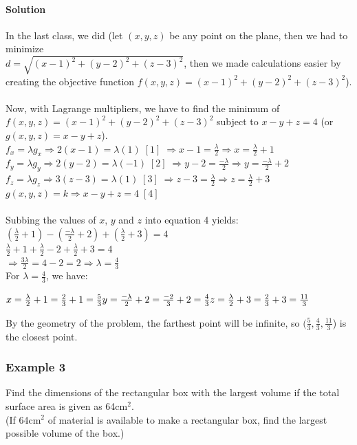 \documentclass{article}
\newenvironment{ind}[1]
 {\begin{list}{}
         {\setlength{\leftmargin}{#1}}
         \item[]
 }
 {\end{list}}
\begin{document}
\paragraph{Solution} In the last class, we did (let $(x,y,z)$ be any point on the plane, then we had to minimize \\$d=\sqrt{(x-1)^2+(y-2)^2+(z-3)^2}$,
then we made calculations easier by creating the objective function $f(x,y,z)=(x-1)^2+(y-2)^2+(z-3)^2$).
\\\\Now, with Lagrange multipliers, we have to find the minimum of $f(x,y,z)=(x-1)^2+(y-2)^2+(z-3)^2$ subject to $x-y+z=4$ (or $g(x,y,z)=x-y+z$).
\\$f_x=\lambda g_x\Rightarrow2(x-1)=\lambda(1)\;[1]\;\Rightarrow x-1=\frac{\lambda}{2}\Rightarrow x=\frac{\lambda}{2}+1$
\\$f_y=\lambda g_y\Rightarrow2(y-2)=\lambda(-1)\;[2]\;\Rightarrow y-2=\frac{-\lambda}{2}\Rightarrow y=\frac{-\lambda}{2}+2$
\\$f_z=\lambda g_z\Rightarrow3(z-3)=\lambda(1)\;[3]\;\Rightarrow z-3=\frac{\lambda}{2}\Rightarrow z=\frac{\lambda}{2}+3$
\\$g(x,y,z)=k\Rightarrow x-y+z=4\;[4]$
\\\\Subbing the values of $x$, $y$ and $z$ into equation 4 yields: $(\frac{\lambda}{2}+1)-(\frac{-\lambda}{2}+2)+(\frac{\lambda}{2}+3)=4$
\\$\frac{\lambda}{2}+1+\frac{\lambda}{2}-2+\frac{\lambda}{2}+3=4$
\\$\Rightarrow \frac{3\lambda}{2}=4-2=2\Rightarrow\lambda=\frac{4}{3}$
\\For $\lambda=\frac{4}{3}$, we have: \begin{ind}{3cm}
    $x=\frac{\lambda}{2}+1=\frac{2}{3}+1=\frac{5}{3}
    \\y=\frac{-\lambda}{2}+2=\frac{-2}{3}+2=\frac{4}{3}
    \\z=\frac{\lambda}{2}+3=\frac{2}{3}+3=\frac{11}{3}$
\end{ind}
By the geometry of the problem, the farthest point will be infinite, so $(\frac{5}{3},\frac{4}{3},\frac{11}{3}$) is the closest point.

\newpage\subsubsection{Example 3}
Find the dimensions of the rectangular box with the largest volume if the total surface area is given as 64cm$^2$.
\\(If 64cm$^2$ of material is available to make a rectangular box, find the largest possible volume of the box.)\
\end{document}
